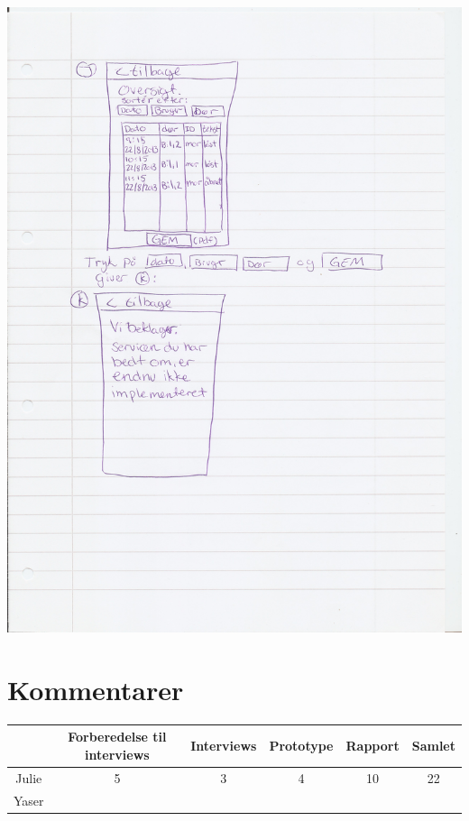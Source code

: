 \documentclass[a4paper,12pt]{article}
\begin{document}
\includegraphics[width=\textwidth]{proto/JK.jpg}

\section{Kommentarer}
\begin{tabular}{|c|c|c|c|c|c|}
	\hline & Forberedelse til interviews & Interviews & Prototype & Rapport & Samlet \\
	\hline Julie & 5 & 3 & 4 & 10 & 22 \\
	\hline Yaser & & & & & \\
	\hline
\end{tabular}
\end{document}
